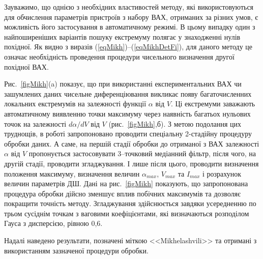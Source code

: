 Зауважимо, що однією з необхідних властивостей методу, які використовуються для обчислення параметрів пристроїв з набору ВАХ, отриманих за різних умов, є можливість його застосування в автоматичному режимі.
В цьому випадку один з найпоширеніших варіантів пошуку екстремуму полягає у знаходженні нулів похідної.
Як видно з виразів (\ref{eqMikh})--(\ref{eqMikhDetFi}), для даного методу це означає необхідність проведення процедури чисельного визначення другої похідної ВАХ.


Рис.~\ref{figMikh}(a) показує, що при використанні експериментальних ВАХ чи зашумлених даних чисельне диференціювання викликає появу багаточисленних локальних екстремумів на залежності функції $\alpha$ від $V$.
Ці екстремуми заважають автоматичному виявленню точки максимуму через наявність багатьох нульових точок на залежності $d\alpha/dV$ від $V$ (рис.~\ref{figMikh},б).
З метою подолання цих труднощів, в роботі запропоновано проводити спеціальну 2-стадійну процедуру обробки даних.
А саме, на першій стадії обробки до отриманої з ВАХ залежності $\alpha$ від $V$ пропонується застосовувати 3--точковий медіанний фільтр, після чого, на другій стадії, проводити згладжування.
І лише після цього, проводити визначення положення максимуму, визначення величин $\alpha_{max}$, $V_{max}$  та $I_{max}$ і розрахунок величин параметрів ДШ.
Дані на рис.~\ref{figMikh} показують, що запропонована процедура обробки дійсно зменшує вплив побічних максимумів та дозволяє покращити точність методу.
Згладжування здійснюється завдяки усередненню по трьом сусіднім точкам з ваговими коефіцієнтами, які визначаються розподілом Гауса з дисперсією, рівною 0,6.

Надалі наведено результати, позначені міткою <<Mikhelashvili>> та отримані з використанням зазначеної процедури обробки.


